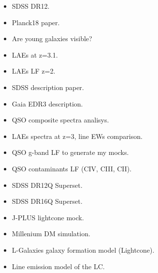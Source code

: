 \documentclass[a4paper,fleqn,usenatbib]{mnras}
\begin{document}
\begin{itemize}
    \item SDSS DR12. \cite{Alam2015}
    \item Planck18 paper. \cite{Planck18}
    \item Are young galaxies visible? \cite{Partridge1967}
    \item LAEs at z=3.1. \cite{Gronwall2007}
    \item LAEs LF z=2. \cite{Sobral2017}
    \item SDSS description paper. \cite{York2000}
    \item Gaia EDR3 description. \cite{Brown2021}
    \item QSO composite spectra analisys. \cite{VandenBerk2001}
    \item LAEs spectra at z=3, line EWs comparison. \cite{Nakajima2018}
    \item QSO g-band LF to generate my mocks. \cite{Palanque-Delabrouille2016}
    \item QSO contaminants LF (CIV, CIII, CII). \cite{Stroe2017a, Stroe2017b}
    \item SDSS DR12Q Superset. \cite{Paris2017}
    \item SDSS DR16Q Superset. \cite{Lyke2020}
    \item J-PLUS lightcone mock. \cite{Izquierdo-Villalba2019}
    \item Millenium DM simulation. \cite{Springel2005}
    \item L-Galaxies galaxy formation model (Lightcone). \cite{Guo2011}
    \item Line emission model of the LC. \cite{Orsi2014}
\end{itemize}













\bsp	%
\label{lastpage}
\end{document}
